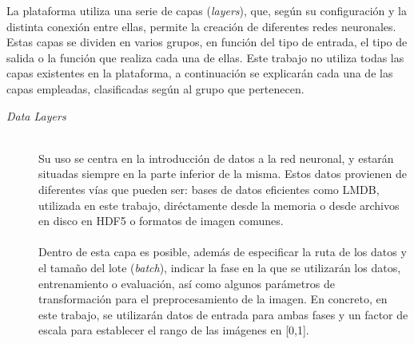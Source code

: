 La plataforma utiliza una serie de capas (\textit{layers}), que, según su configuración y la distinta conexión entre ellas, permite la creación de diferentes redes neuronales. Estas capas se dividen en varios grupos, en función del tipo de entrada, el tipo de salida o la función que realiza cada una de ellas. Este trabajo no utiliza todas las capas existentes en la plataforma, a continuación se explicarán cada una de las capas empleadas, clasificadas según al grupo que pertenecen.
\vspace{20pt}
\begin{description}
\item[\textit{Data Layers}] \hfill 
\vspace{10pt}
\\
	Su uso se centra en la introducción de datos a la red neuronal, y estarán situadas siempre en la parte inferior de la misma. Estos datos provienen de diferentes vías que pueden ser: bases de datos eficientes como LMDB, utilizada en este trabajo, diréctamente desde la memoria o desde archivos en disco en HDF5 o formatos de imagen comunes.\\
	\vspace{-10pt}
	\\
	Dentro de esta capa es posible, además de especificar la ruta de los datos y el tamaño del lote (\textit{batch}), indicar la fase en la que se utilizarán los datos, entrenamiento o evaluación, así como algunos parámetros de transformación para el preprocesamiento de la imagen. En concreto, en este trabajo, se utilizarán datos de entrada para ambas fases y un factor de escala para establecer el rango de las imágenes en [0,1].
	\vspace{15pt}
	

\end{description}
